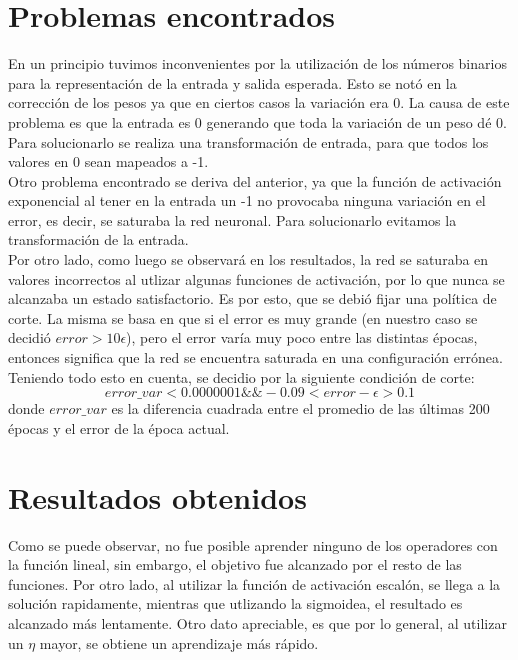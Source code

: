 \documentclass{sig-alternate}
\begin{document}
\section*{Problemas encontrados}
En un principio tuvimos inconvenientes por la utilizaci\'on de los n\'umeros binarios para la representaci\'on de la entrada y salida esperada. Esto se not\'o en la correcci\'on de los pesos ya que en ciertos casos la variaci\'on era 0. La causa de este problema es que la entrada es 0 generando que toda la variaci\'on de un peso d\'e 0. Para solucionarlo se realiza una transformaci\'on de entrada, para que todos los valores en 0 sean mapeados a -1. \\
Otro problema encontrado se deriva del anterior, ya que la funci\'on de activaci\'on exponencial al tener en la entrada un -1 no provocaba ninguna variaci\'on en el error, es decir, se saturaba la red neuronal. Para solucionarlo evitamos la transformaci\'on de la entrada. \\
Por otro lado, como luego se observar\'a en los resultados, la red se saturaba en valores incorrectos al utlizar algunas funciones de activaci\'on, por lo que nunca se alcanzaba un estado satisfactorio. Es por esto, que se debi\'o fijar una pol\'itica de corte. La misma se basa en que si el error es muy grande (en nuestro caso se decidi\'o $error > 10\epsilon$), pero el error var\'ia muy poco entre las distintas \'epocas, entonces significa que la red se encuentra saturada en una configuraci\'on err\'onea. Teniendo todo esto en cuenta, se decidio por la siguiente condici\'on de corte:
	\begin{equation}
		error\_var <  0.0000001 \&\& -0.09 < error - \epsilon > 0.1
	\end{equation} 
donde $error\_var$ es la diferencia cuadrada entre el promedio de las \'ultimas 200 \'epocas y el error de la \'epoca actual.
\section*{Resultados obtenidos}
Como se puede observar, no fue posible aprender ninguno de los operadores con la funci\'on lineal, sin embargo, el objetivo fue alcanzado por el resto de las funciones. Por otro lado, al utilizar la funci\'on de activaci\'on escal\'on, se llega a la soluci\'on rapidamente, mientras que utlizando la sigmoidea, el resultado es alcanzado m\'as lentamente. Otro dato apreciable, es que por lo general, al utilizar un $\eta$ mayor, se obtiene un aprendizaje m\'as r\'apido.
\end{document}
